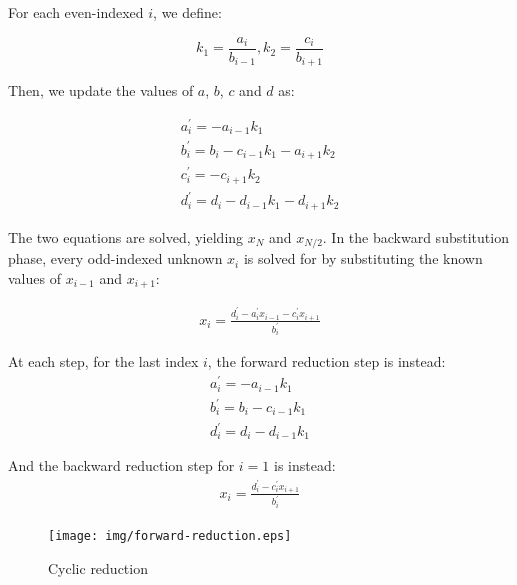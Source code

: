 \documentclass{article}
\begin{document}
        For each even-indexed $i$, we define:

        \begin{equation*}
        k_1 = \frac{a_i}{b_{i-1}},
        k_2 = \frac{c_i}{b_{i+1}}
        \end{equation*}

        Then, we update the values of $a$, $b$, $c$ and $d$ as:

        \begin{align} \label{eqn:forward-reduction}
        & a^{\prime}_i = -a_{i-1}k_1 & \\
        & b^{\prime}_i = b_i - c_{i-1}k_1 - a_{i+1}k_2 & \\
        & c^{\prime}_i = -c_{i+1}k_2 & \\
        & d^{\prime}_i = d_i - d_{i-1}k_1  - d_{i+1}k_2 &
        \end{align}

        The two equations are solved, yielding $x_N$ and $x_{N/2}$.
        In the backward substitution phase, every odd-indexed unknown $x_i$
        is solved for by substituting the known values of $x_{i-1}$ and $x_{i+1}$:

        \begin{align} \label{eqn:back-substitution}
        x_i = \frac{d^{\prime}_i - a^{\prime}_ix_{i-1} - c^{\prime}_ix_{i+1}}{b^{\prime}_i}
        \end{align}

        At each step, for the last index $i$, the forward reduction step is
        instead:
        \begin{align} \label{eqn:forward-reduction-right}
            & a^{\prime}_i = -a_{i-1}k_1 & \\
            & b^{\prime}_i = b_i - c_{i-1}k_1 & \\
            & d^{\prime}_i = d_i - d_{i-1}k_1 &
        \end{align}

        And the backward reduction step for $i=1$ is instead:
        \begin{align} \label{eqn:back-substitution-right}
        x_i = \frac{d^{\prime}_i - c^{\prime}_ix_{i+1}}{b^{\prime}_i}
        \end{align}

        \begin{figure}[h]
        \begin{center}
        \texttt{[image: img/forward-reduction.eps]}
        \end{center}
        \caption{Cyclic reduction}
        \label{fig:forward-reduction}
        \end{figure}
\end{document}
